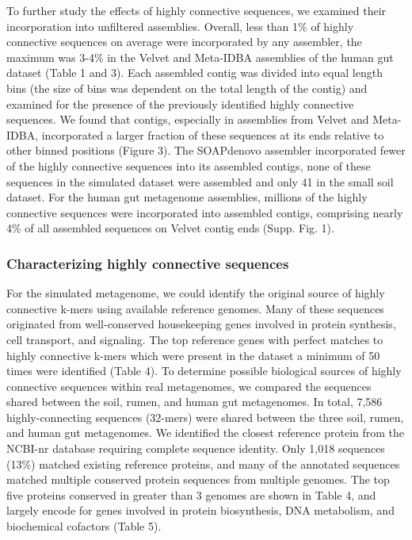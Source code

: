 \documentclass[10pt]{article}
\begin{document}
To further study the effects of highly connective sequences, we examined their incorporation into unfiltered assemblies.   Overall, less than 1\% of highly connective sequences on average were incorporated by any assembler, the maximum was 3-4\% in the Velvet and Meta-IDBA assemblies of the human gut dataset (Table 1 and 3).  Each assembled contig was divided into equal length bins (the size of bins was dependent on the total length of the contig) and examined for the presence of the previously identified highly connective sequences.  We found that contigs, especially in assemblies from Velvet and Meta-IDBA, incorporated a larger fraction of these sequences at its ends relative to other binned positions (Figure 3).  The SOAPdenovo assembler incorporated fewer of the highly connective sequences into its assembled contigs, none of these sequences in the simulated dataset were assembled and only 41 in the small soil dataset.  For the human gut metagenome assemblies, millions of the highly connective sequences were incorporated into assembled contigs, comprising nearly 4\% of all assembled sequences on Velvet contig ends (Supp. Fig. 1).

\subsubsection*{Characterizing highly connective sequences}

For the simulated metagenome, we could identify the original source of highly connective k-mers using available reference genomes.  Many of these sequences originated from well-conserved housekeeping genes involved in protein synthesis, cell transport, and signaling.  The top reference genes with perfect matches to highly connective k-mers which were present in the dataset a minimum of 50 times were identified (Table 4).  To determine possible biological sources of highly connective sequences within real metagenomes, we compared the sequences shared between the soil, rumen, and human gut metagenomes.  In total, 7,586 highly-connecting sequences (32-mers) were shared between the three soil, rumen, and human gut metagenomes.  We identified the closest reference protein from the NCBI-nr database requiring complete sequence identity.  Only 1,018 sequences (13\%) matched existing reference proteins, and many of the annotated sequences matched multiple conserved protein sequences from multiple genomes.  The top five proteins conserved in greater than 3 genomes are shown in Table 4, and largely encode for genes involved in protein biosynthesis, DNA metabolism, and biochemical cofactors (Table 5).
\end{document}
